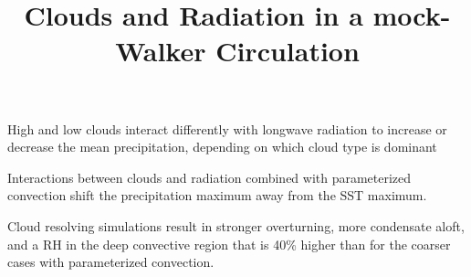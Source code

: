 \documentclass[draft]{agujournal2019}
\begin{document}
\title{Clouds and Radiation in a mock-Walker Circulation}



\begin{keypoints}
  \item{High and low clouds interact differently with longwave radiation to increase or decrease the mean precipitation, depending on which cloud type is dominant}
  \item{Interactions between clouds and radiation combined with parameterized convection shift the precipitation 
  maximum away from the SST maximum.}
  \item{Cloud resolving simulations result in stronger overturning, more condensate aloft, and a RH in the deep convective 
  region that is 40\% higher than for the coarser cases with parameterized convection.}
\end{keypoints}
\end{document}
